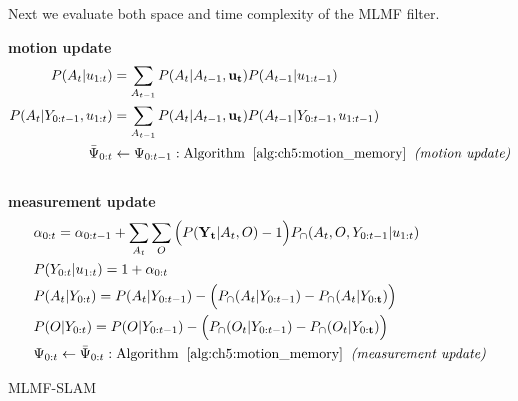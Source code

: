 Next we evaluate both space and time complexity of the MLMF filter.

\newpage
\begin{center}
\begin{minipage}{\linewidth}
\begin{algorithm}[H]
\label{alg:mrf-slam}
\nonl\hrulefill	
\BlankLine
\nonl\textbf{motion update}\\
\nonl\begin{align}
P(A_t|u_{1:t})  	 &= \sum\limits_{A_{t-1}} P(A_t|A_{t-1},\mathbf{u_t})  P(A_{t-1}|u_{1:t-1}) \nonumber \\
P(A_t|Y_{0:t-1},u_{1:t}) &= \sum\limits_{A_{t-1}} P(A_t|A_{t-1},\mathbf{u_t})  P(A_{t-1}|Y_{0:t-1},u_{1:t-1}) \nonumber \\
\bar{\Psi}_{0:t} 	 &\gets \Psi_{0:t-1}: \mathrm{ Algorithm\;\; \ref{alg:ch5:motion_memory}\;\; \textit{(motion update)}} \nonumber
\end{align}
\BlankLine
\nonl\hrulefill	\\
\nonl\textbf{measurement update}
\nonl\begin{align}
 &\alpha_{0:t}       = \alpha_{0:t-1} + \sum\limits_{A_t}\sum\limits_{O} \Big(P(\mathbf{Y_t}|A_t,O) - 1\Big)P_{\cap}(A_t,O,Y_{0:t-1}|u_{1:t}) \nonumber \\
 &P(Y_{0:t}|u_{1:t}) = 1 + \alpha_{0:t} \nonumber\\
 &P(A_t|Y_{0:t})     = P(A_t|Y_{0:t-1}) - \Big(P_{\cap}(A_t|Y_{0:t-1}) -  P_{\cap}(A_t|Y_{0:\mathbf{t}}) \Big) \nonumber \\
 &P(O|Y_{0:t})       = P(O|Y_{0:t-1}) -  \Big(  P_{\cap}(O_t|Y_{0:t-1}) -  P_{\cap}(O_t|Y_{0:\mathbf{t}})\Big) \nonumber \\    
 &\Psi_{0:t} \gets \bar{\Psi}_{0:t}: \mathrm{Algorithm\;\; \ref{alg:ch5:motion_memory}\;\; \textit{(measurement update)}} \nonumber
 \end{align}
\caption{MLMF-SLAM}
\end{algorithm} 
\end{minipage}
\end{center}
\newpage

